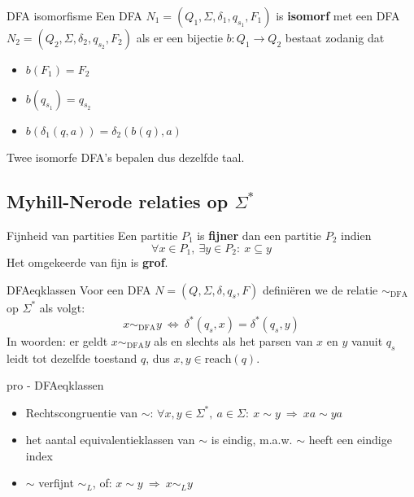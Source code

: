 \begin{theo}{DFA isomorfisme}
    Een DFA $N_1 = (Q_1, \Sigma, \delta_1, q_{s_1}, F_1)$ is \textbf{isomorf} met een DFA $N_2 = (Q_2, \Sigma, \delta_2, q_{s_2}, F_2)$ als er een bijectie $b: Q_1 \to Q_2$ bestaat zodanig dat
    \begin{itemize}
        \item $b(F_1) = F_2$
        \item $b(q_{s_1}) = q_{s_2}$
        \item $b(\delta_1(q,a)) = \delta_2(b(q),a)$
    \end{itemize}
    Twee isomorfe DFA's bepalen dus dezelfde taal.
\end{theo}

\subsection{Myhill-Nerode relaties op $\Sigma^*$}

\vspace{0.5cm}

\begin{theo}{Fijnheid van partities}
    Een partitie $P_1$ is \textbf{fijner} dan een partitie $P_2$ indien
    \begin{equation*}
        \forall x \in P_1,\ \exists y \in P_2: \ x \subseteq y
    \end{equation*}
    Het omgekeerde van fijn is \textbf{grof}.
\end{theo}

\newpage

\begin{theo}{DFAeqklassen}
    Voor een DFA $N = (Q, \Sigma, \delta, q_s, F)$ definiëren we de relatie $\sim_{\text{DFA}}$ op $\Sigma^*$ als volgt:
    \begin{equation*}
        x \sim_{\text{DFA}} y \ \Leftrightarrow \ \delta^*(q_s,x) = \delta^*(q_s,y)
    \end{equation*}
    In woorden: er geldt $x \sim_{\text{DFA}} y$ als en slechts als het parsen van $x$ en $y$ vanuit $q_s$ leidt tot dezelfde toestand $q$, dus $x,y \in \text{reach}(q)$.
\end{theo}

\begin{pro}{pro - DFAeqklassen}
    \begin{itemize}
        \item Rechtscongruentie van $\sim$: $\forall x,y \in \Sigma^*, \ a \in \Sigma: \ x \sim y \ \Rightarrow \ xa \sim ya $
        \item het aantal equivalentieklassen van $\sim$ is eindig, m$.$a$.$w$.$ $\sim$ heeft een eindige index
        \item $\sim$ verfijnt $\sim_L$, of: $x \sim y \ \Rightarrow \ x \sim_L y$
    \end{itemize}
\end{pro}

